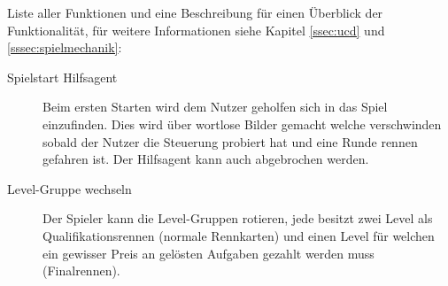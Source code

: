 	Liste aller Funktionen und eine Beschreibung für einen Überblick der Funktionalität, für weitere Informationen siehe Kapitel \ref{ssec:ucd} und \ref{sssec:spielmechanik}:
	\begin{description}
		\item[Spielstart Hilfsagent]{ Beim ersten Starten wird dem Nutzer geholfen sich in das Spiel einzufinden. Dies wird über wortlose Bilder gemacht welche verschwinden sobald der Nutzer die Steuerung probiert hat und eine Runde rennen gefahren ist. Der Hilfsagent kann auch abgebrochen werden. }
		\item[Level-Gruppe wechseln]{
			Der Spieler kann die Level-Gruppen rotieren, jede besitzt zwei Level als Qualifikationsrennen (normale Rennkarten) und einen Level für welchen ein gewisser Preis an gelösten Aufgaben gezahlt werden muss (Finalrennen).

}
\end{description}
